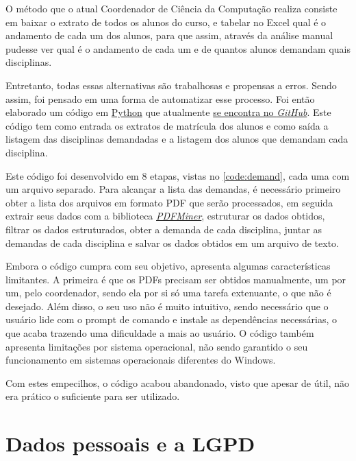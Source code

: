 O método que o atual Coordenador de Ciência da Computação realiza consiste em baixar o extrato de todos os alunos do curso, e tabelar no Excel qual é o andamento de cada um dos alunos, para que assim, através da análise manual pudesse ver qual é o andamento de cada um e de quantos alunos demandam quais disciplinas.

Entretanto, todas essas alternativas são trabalhosas e propensas a erros. Sendo assim, foi pensado em uma forma de automatizar esse processo. Foi então elaborado um código em \href{https://www.python.org/}{Python} que atualmente \href{https://github.com/jvfd3/university_demand}{se encontra no \textit{GitHub}}. Este código tem como entrada os extratos de matrícula dos alunos e como saída a listagem das disciplinas demandadas e a listagem dos alunos que demandam cada disciplina.



Este código foi desenvolvido em 8 etapas, vistas no \autoref{code:demand}, cada uma com um arquivo separado. Para alcançar a lista das demandas, é necessário primeiro obter a lista dos arquivos em formato PDF que serão processados, em seguida extrair seus dados com a biblioteca \href{https://pypi.org/project/pdfminer/}{\textit{PDFMiner}}, estruturar os dados obtidos, filtrar os dados estruturados, obter a demanda de cada disciplina, juntar as demandas de cada disciplina e salvar os dados obtidos em um arquivo de texto.

Embora o código cumpra com seu objetivo, apresenta algumas características limitantes. A primeira é que os PDFs precisam ser obtidos manualmente, um por um, pelo coordenador, sendo ela por si só uma tarefa extenuante, o que não é desejado. Além disso, o seu uso não é muito intuitivo, sendo necessário que o usuário lide com o prompt de comando e instale as dependências necessárias, o que acaba trazendo uma dificuldade a mais ao usuário. O código também apresenta limitações por sistema operacional, não sendo garantido o seu funcionamento em sistemas operacionais diferentes do Windows.

Com estes empecilhos, o código acabou abandonado, visto que apesar de útil, não era prático o suficiente para ser utilizado.

\section{Dados pessoais e a LGPD} %

